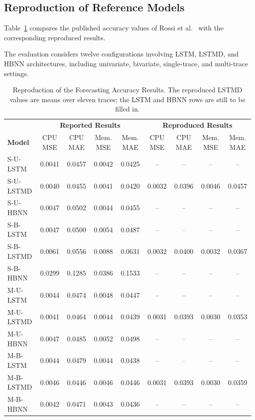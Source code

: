 \documentclass[conference]{IEEEtran}
\newcommand{\pend}{{\color{red}--}}
\begin{document}
\subsection{Reproduction of Reference Models}

Table~\ref{tab:repro} compares the published accuracy values of Rossi et al.~\cite{rossi2025} with the corresponding reproduced results.

The evaluation considers twelve configurations involving LSTM, LSTMD, and HBNN architectures, including univariate, bivariate, single-trace, and multi-trace settings.

\begin{table}[!t]
\caption{Reproduction of the Forecasting Accuracy Results. The reproduced LSTMD values are means over eleven traces; the LSTM and HBNN rows are still to be filled in.}
\label{tab:repro}
\centering
\footnotesize
\begin{tabular}{lcccc|cccc}
\toprule
& \multicolumn{4}{c|}{\textbf{Reported Results}}
& \multicolumn{4}{c}{\textbf{Reproduced Results}}\\
\textbf{Model}
& CPU MSE & CPU MAE & Mem. MSE & Mem. MAE
& CPU MSE & CPU MAE & Mem. MSE & Mem. MAE\\
\midrule
S-U-LSTM  & 0.0041 & 0.0457 & 0.0042 & 0.0425 & \pend & \pend & \pend & \pend\\
S-U-LSTMD & 0.0040 & 0.0455 & 0.0041 & 0.0420 & 0.0032 & 0.0396 & 0.0046 & 0.0457\\
S-U-HBNN  & 0.0047 & 0.0502 & 0.0044 & 0.0455 & \pend & \pend & \pend & \pend\\
S-B-LSTM  & 0.0047 & 0.0500 & 0.0054 & 0.0487 & \pend & \pend & \pend & \pend\\
S-B-LSTMD & 0.0061 & 0.0556 & 0.0088 & 0.0631 & 0.0032 & 0.0400 & 0.0032 & 0.0367\\
S-B-HBNN  & 0.0299 & 0.1285 & 0.0386 & 0.1533 & \pend & \pend & \pend & \pend\\
M-U-LSTM  & 0.0044 & 0.0474 & 0.0048 & 0.0447 & \pend & \pend & \pend & \pend\\
M-U-LSTMD & 0.0041 & 0.0464 & 0.0044 & 0.0439 & 0.0031 & 0.0393 & 0.0030 & 0.0353\\
M-U-HBNN  & 0.0047 & 0.0485 & 0.0052 & 0.0498 & \pend & \pend & \pend & \pend\\
M-B-LSTM  & 0.0044 & 0.0479 & 0.0044 & 0.0438 & \pend & \pend & \pend & \pend\\
M-B-LSTMD & 0.0046 & 0.0446 & 0.0046 & 0.0446 & 0.0031 & 0.0393 & 0.0030 & 0.0359\\
M-B-HBNN  & 0.0042 & 0.0471 & 0.0043 & 0.0436 & \pend & \pend & \pend & \pend\\
\bottomrule
\end{tabular}
\end{table}
\end{document}
